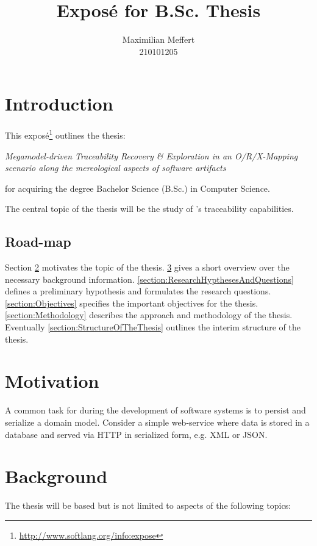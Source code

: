 \documentclass[runningheads,a4paper]{llncs}
\title{Exposé for B.Sc. Thesis}
\subtitle{\thesis}
\author{Maximilian Meffert\\210101205}
\institute{University of Koblenz-Landau}
\newcommand{\megal}{\text{MegaL}}
\newcommand{\thesis}{Megamodel-driven Traceability Recovery \& Exploration in an O/R/X-Mapping scenario along the mereological aspects of software artifacts}
\begin{document}
\maketitle
%


\section{Introduction}
This exposé\footnote{\url{http://www.softlang.org/info:expose}} outlines the thesis:
\begin{center}
\it
\thesis
\end{center}
for acquiring the degree Bachelor Science (B.Sc.) in Computer Science.

The central topic of the thesis will be the study of \megal's traceability capabilities.


\subsection{Road-map}
Section \ref{section:Motivation} motivates the topic of the thesis.
\ref{section:Background} gives a short overview over the necessary background information.
\ref{section:ResearchHypthesesAndQuestions} defines a preliminary hypothesis and formulates the research questions.
\ref{section:Objectives} specifies the important objectives for the thesis.
\ref{section:Methodology} describes the approach and methodology of the thesis.
Eventually \ref{section:StructureOfTheThesis} outlines the interim structure of the thesis.


\section{Motivation}
\label{section:Motivation}
A common task for during the development of software systems is to persist and serialize a domain model.
Consider a simple web-service where data is stored in a database and served via HTTP in serialized form, e.g. XML or JSON.





\section{Background}
\label{section:Background}
The thesis will be based but is not limited to aspects of the following topics:
\end{document}
